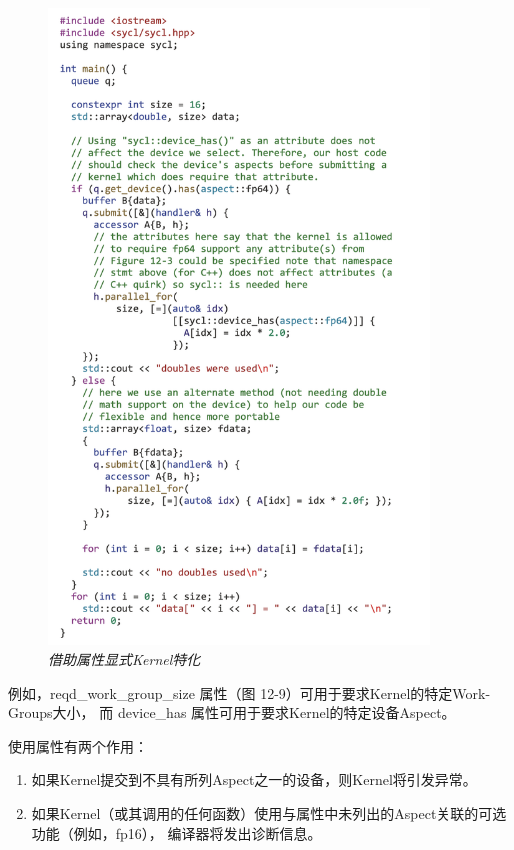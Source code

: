 \begin{figure}[H]
	\centering
	\includegraphics[width=0.9\textwidth]{figs/F12.10.png}
	\caption{\textit{借助属性显式Kernel特化 }}
\end{figure}

例如，reqd\_work\_group\_size 属性（图 12-9）可用于要求Kernel的特定Work-Groups大小，
而 device\_has 属性可用于要求Kernel的特定设备Aspect。

使用属性有两个作用：

\begin{enumerate}
	\item 如果Kernel提交到不具有所列Aspect之一的设备，则Kernel将引发异常。

	\item 如果Kernel（或其调用的任何函数）使用与属性中未列出的Aspect关联的可选功能（例如，fp16），
	编译器将发出诊断信息。
\end{enumerate}

